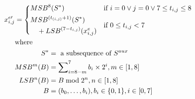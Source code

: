 \begin{align}
	\label{eq:embed1}
	x^{e\prime}_{i, j}  &= 
	\begin{dcases}
		MSB^8(S^\ast)                   & \text{if }  i = 0 \vee j = 0 \vee 7 \leq t_{i, j} \leq  8\\
		\begin{multlined}
			MSB^{(t_{(i, j)} + 1)}(S^\ast) \\
			+ LSB^{(7 - t_{i, j})}(x^e_{i, j})
		\end{multlined} & \text{if } 0 \leq t_{i, j} < 7 
	\end{dcases} 
	\\ 
	& \text{where} \notag \\
	&
	\begin{aligned}
		S^\ast     & = \text{ a subsequence of } S^{aux}  \\
		MSB^{m}(B) & = \sum\nolimits_{i = 8 - m}^7 b_i \times 2^i, m \in [1, 8] \\
		LSB^{n}(B) & = B \bmod 2^n, n \in [1, 8] \\
		B &= (b_0, \dots, b_i), b_i \in \{0, 1\}, i \in [0, 7]
	\end{aligned} \notag
\end{align}

